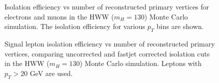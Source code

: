 \begin{figure}[!htbp]
\begin{center}
\caption{Isolation efficiency vs number of reconstructed primary vertices for electrons and muons
in the HWW ($m_{H} = 130$) Monte Carlo simulation. The isolation efficiency for various $p_{T}$ 
bins are shown.}
\label{fig:HWW130IsoEff_vs_NVertices}
\end{center}
\end{figure}


\begin{figure}[!htbp]
\begin{center}
\caption{Signal lepton isolation efficiency vs number of reconstructed primary vertices, comparing uncorrected 
and fastjet corrected isolation cuts in the HWW ($m_{H} = 130$) Monte Carlo simulation. Leptons
with $p_{T} > 20$ GeV are used.}
\label{fig:HWW130IsoEff_vs_NVertices_FastjetCorrection}
\end{center}
\end{figure}

